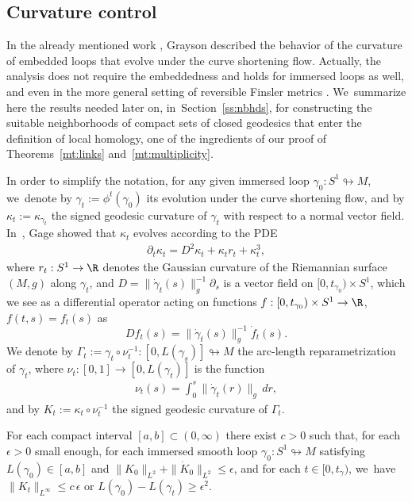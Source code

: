 \subsection{Curvature control}\label{ss:curvature}

In the already mentioned work \cite{Grayson:1989aa}, Grayson described the behavior of the curvature of embedded loops that evolve under the curve shortening flow. Actually, the analysis does not require the embeddedness and holds for immersed loops as well, and even in the more general setting of reversible Finsler metrics \cite[\S 2.5]{De-Philippis:2022aa}. We~summarize here the results needed later on, in~Section~\ref{ss:nbhds}, for constructing the suitable neighborhoods of compact sets of closed geodesics that enter the definition of local homology, one of the ingredients of our proof of Theorems~\ref{mt:links} and~\ref{mt:multiplicity}.

In order to simplify the notation, for any given immersed loop $\gamma_0:S^1\looparrowright M$, we~denote by $\gamma_t:=\phi^t(\gamma_0)$ its evolution under the curve shortening flow, and by $\kappa_t:=\kappa_{\gamma_t}$ the signed geodesic curvature of $\gamma_t$ with respect to a normal vector field. In~\cite[Lem.\,1.2]{Gage:1990aa}, Gage showed that $\kappa_t$ evolves according to the PDE
\begin{align}
\label{e:PDE_curvature}
\partial_t\kappa_t=D^2\kappa_t+\kappa_t r_t+\kappa_t^3,
\end{align}
where $r_t:S^1\to\R$ denotes the Gaussian curvature of the Riemannian surface $(M,g)$ along $\gamma_t$, and $D=\|\dot\gamma_t(s)\|_g^{-1}\partial_s$ is a vector field on $[0,t_{\gamma_0})\times S^1$, which we see as a differential operator acting on functions $f:[0,t_{\gamma_0})\times S^1\to\R$, $f(t,s)=f_t(s)$ as
\[
Df_t(s)=\|\dot\gamma_t(s)\|_g^{-1}\dot f_t(s).
\]
We denote by $\Gamma_t:=\gamma_t\circ\nu_t^{-1}:[0,L(\gamma_s)]\looparrowright M$ the arc-length reparametrization of $\gamma_t$, where $\nu_t:[0,1]\to[0,L(\gamma_t)]$ is the function
\begin{align*}
\nu_t(s) = \int_0^s \|\dot\gamma_t(r)\|_g\,dr,
\end{align*}
and by $K_t:=\kappa_t\circ\nu_t^{-1}$ the signed geodesic curvature of $\Gamma_t$.

\begin{Prop}\label{p:curvature_control}
For each compact interval $[a,b]\subset(0,\infty)$ there exist $c>0$ such that, for each $\epsilon>0$ small enough, for each immersed smooth loop $\gamma_0:S^1\looparrowright M$ satisfying $L(\gamma_0)\in[a,b]$ and $\|K_0\|_{L^2}+\|\dot K_0\|_{L^2}\leq\epsilon$, and for each $t\in[0,t_\gamma)$, we~have $\|K_t\|_{L^\infty}\leq c\,\epsilon$ or $L(\gamma_0)-L(\gamma_t)\geq \epsilon^2$.
\end{Prop}

